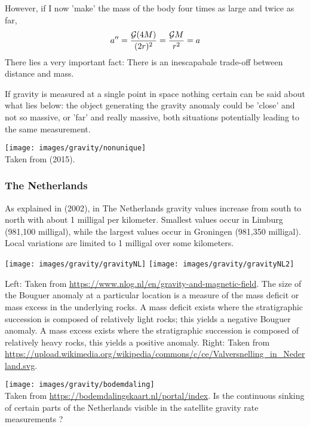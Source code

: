 However, if I now 'make' the mass of the body four times as large and twice as far, 
\[
a'' = \frac{{\cal G} (4M)}{(2r)^2} = \frac{{\cal G} M}{r^2} =a
\]
There lies a very important fact: There is an inescapabale trade-off between distance 
and mass. 

If gravity is measured at a single point in space nothing certain can be said about 
what lies below: the object generating the gravity anomaly could be 'close' and 
not so massive, or 'far' and really massive, 
both situations potentially leading to the same measurement.

\begin{center}
\texttt{[image: images/gravity/nonunique]}\\
{\captionfont Taken from \textcite{vapb15} (2015).}
\end{center}


\subsubsection{The Netherlands}

As explained in \textcite{crdv02} (2002),  
in The Netherlands gravity values
increase from south to north with about 1 milligal per kilometer. Smallest values occur
in Limburg (981,100 milligal), while the largest values occur in Groningen (981,350
milligal). Local variations are limited to 1 milligal over some kilometers.


\begin{center}
\texttt{[image: images/gravity/gravityNL]}
\texttt{[image: images/gravity/gravityNL2]}\\
{\captionfont Left: Taken from \url{https://www.nlog.nl/en/gravity-and-magnetic-field}. 
The size of the Bouguer anomaly at a particular location is a measure of the mass deficit or mass 
excess in the underlying rocks. A mass deficit  exists where  the stratigraphic succession is composed of relatively light rocks; 
this yields a negative Bouguer anomaly. A mass excess exists where the stratigraphic succession is 
composed of relatively heavy rocks, this yields a positive anomaly.
Right: Taken from \url{https://upload.wikimedia.org/wikipedia/commons/c/ce/Valversnelling_in_Nederland.svg}.

}
\end{center}

\begin{center}
\texttt{[image: images/gravity/bodemdaling]}\\
{\captionfont Taken from \url{https://bodemdalingskaart.nl/portal/index}. Is the continuous sinking of certain parts of the Netherlands 
visible in the satellite gravity rate measurements ?}
\end{center}

